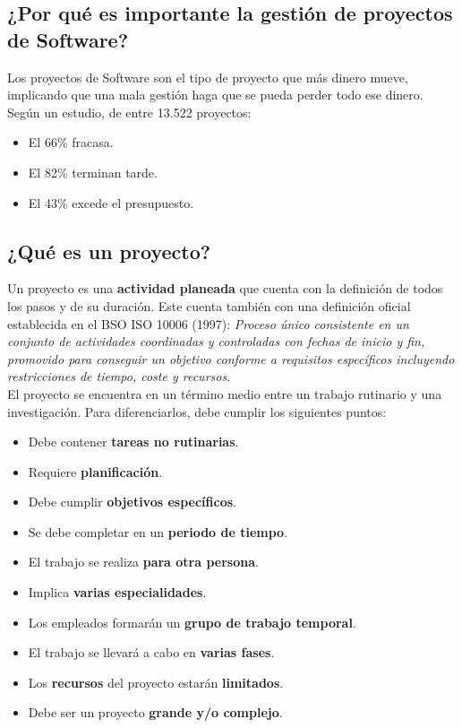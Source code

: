 \documentclass[12pt]{article}
\begin{document}
\subsection[¿Por qué es importante la gestión de proyectos de Software?]{¿Por qué es importante la gestión de proyectos de Software?}
\label{1.2.0}

{Los proyectos de Software son el tipo de proyecto que más dinero mueve, implicando que una mala gestión haga que se pueda perder todo ese dinero. Según un estudio, de entre 13.522 proyectos:}

\begin{itemize}
    \item {El 66\% fracasa.}
    \item {El 82\% terminan tarde.}
    \item {El 43\% excede el presupuesto.}
\end{itemize}

\subsection{¿Qué es un proyecto?}
\label{1.3.0}

{Un proyecto es una \textbf{actividad planeada} que cuenta con la definición de todos los pasos y de su duración. Este cuenta también con una definición oficial establecida en el BSO ISO 10006 (1997): \textit{Proceso único consistente en un conjunto de actividades coordinadas y controladas con fechas de inicio y fin, promovido para conseguir un objetivo conforme a requisitos específicos incluyendo restricciones de tiempo, coste y recursos}.} \\

{El proyecto se encuentra en un término medio entre un trabajo rutinario y una investigación. Para diferenciarlos, debe cumplir los siguientes puntos:}

\begin{itemize}
    \item {Debe contener \textbf{tareas no rutinarias}.}
    \item {Requiere \textbf{planificación}.}
    \item {Debe cumplir \textbf{objetivos específicos}.}
    \item {Se debe completar en un \textbf{periodo de tiempo}.}
    \item {El trabajo se realiza \textbf{para otra persona}.}
    \item {Implica \textbf{varias especialidades}.}
    \item {Los empleados formarán un \textbf{grupo de trabajo temporal}.}
    \item {El trabajo se llevará a cabo en \textbf{varias fases}.}
    \item {Los \textbf{recursos} del proyecto estarán \textbf{limitados}.}
    \item {Debe ser un proyecto \textbf{grande y/o complejo}.}
\end{itemize}
\end{document}
